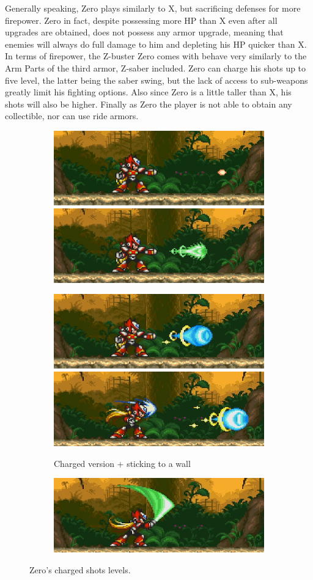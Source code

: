 Generally speaking, Zero plays similarly to X, but sacrificing defenses for more firepower. Zero in fact, despite possessing more HP than X even after all upgrades are obtained, does not possess any armor upgrade, meaning that enemies will always do full damage to him and depleting his HP quicker than X. In terms of firepower, the Z-buster Zero comes with behave very similarly to the Arm Parts of the third armor, Z-saber included. Zero can charge his shots up to five level, the latter being the saber swing, but the lack of access to sub-weapons greatly limit his fighting options. Also since Zero is a little taller than X, his shots will also be higher. Finally as Zero the player is not able to obtain any collectible, nor can use ride armors.


\begin{figure}[htp]
	\centering
	\begin{subfigure}{\linewidth}
		\centering
		\includegraphics[width=.4\linewidth]{figures/X3/weapons/zero_shot_1.png}
		\includegraphics[width=.4\linewidth]{figures/X3/weapons/zero_shot_2.png}
	\end{subfigure}
	\begin{subfigure}{\linewidth}
		\centering
		\includegraphics[width=.4\linewidth]{figures/X3/weapons/zero_shot_3.png}
		\includegraphics[width=.4\linewidth]{figures/X3/weapons/zero_shot_4.png}
		\caption{Charged version + sticking to a wall}	
	\end{subfigure}
\begin{subfigure}{\linewidth}
	\centering
	\includegraphics[width=.5\linewidth]{figures/X3/weapons/zero_shot_5.png}
\end{subfigure}
	\caption{Zero's charged shots levels.}
\end{figure}

